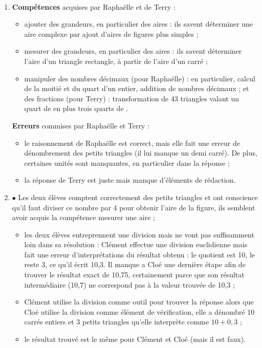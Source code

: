 {\begin{corrige}
\ \\ [-5mm]
\begin{enumerate}
   \item {\bf Compétences} acquises par Raphaëlle  et de Terry :
   \begin{itemize}
      \item ajouter des grandeurs, en particulier des aires : ils savent déterminer une aire complexe par ajout d'aires de figures plus simples ;
      \item mesurer des grandeurs, en particulier des aires : ils savent déterminer l'aire d'un triangle rectangle, à partir de l'aire d'un carré ;
      \item manipuler des nombres décimaux (pour Raphaëlle) : en particulier, calcul de la moitié et du quart d'un entier, addition de nombres décimaux ; et des fractions (pour Terry) : transformation de 43 triangles valant un quart de \ucmq{} en  plus trois quarts de \ucmq{}.
   \end{itemize}
   {\bf Erreurs} commises par Raphaëlle et Terry :
   \begin{itemize}
      \item le raisonnement de Raphaëlle est correct, mais elle fait une erreur de dénombrement des petits triangles (il lui manque un demi carré). De plus, certaines unités sont manquantes, en particulier dans la réponse ;
      \item la réponse de Terry est juste mais manque d'éléments de rédaction.
   \end{itemize}
   \item \textcolor{A1}{$\bullet$} Les deux élèves comptent correctement des petits triangles et ont conscience qu'il faut diviser ce nombre par 4 pour obtenir l'aire de la figure, ils semblent avoir acquis la compétence \og mesurer une aire \fg ;
   \begin{itemize}
      \item les deux élèves entreprennent une division mais ne vont pas suffisamment loin dans sa résolution : Clément effectue une division euclidienne mais fait une erreur d'interprétations du résultat obtenu : le quotient est 10, le reste 3, ce qu'il écrit 10,3. Il manque a Cloé une dernière étape afin de trouver le résultat exact de 10,75, certainement parce que son résultat intermédiaire (10,7) ne correspond pas à la valeur trouvée de 10,3 ;
      \item Clément utilise la division comme outil pour trouver la réponse alors que Cloé utilise la division comme élément de vérification, elle a dénombré 10 carrés entiers et 3 petits triangles qu'elle interprète comme $10 + 0,3$ ;
      \item le résultat trouvé est le même pour Clément et Cloé (mais il est faux).
   \end{itemize}
\end{enumerate}
\end{corrige}

}
